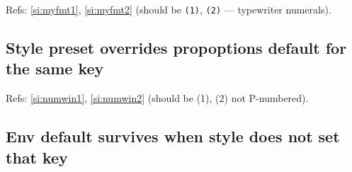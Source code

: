 \documentclass{article}
\begin{document}


\begin{prop}
  \item[style=myformat] \label{si:myfmt1}  %
  \item[style=myformat] \label{si:myfmt2}  %
\end{prop}

Refs: \ref{si:myfmt1}, \ref{si:myfmt2}
(should be \texttt{(1)}, \texttt{(2)} — typewriter numerals).

\subsection{Style preset overrides propoptions default for the same key}



\begin{prop}[style=numbered]
  \item \label{si:numwin1}   %
  \item \label{si:numwin2}   %
\end{prop}


Refs: \ref{si:numwin1}, \ref{si:numwin2} (should be (1), (2) not P-numbered).

\subsection{Env default survives when style does not set that key}

\end{document}
